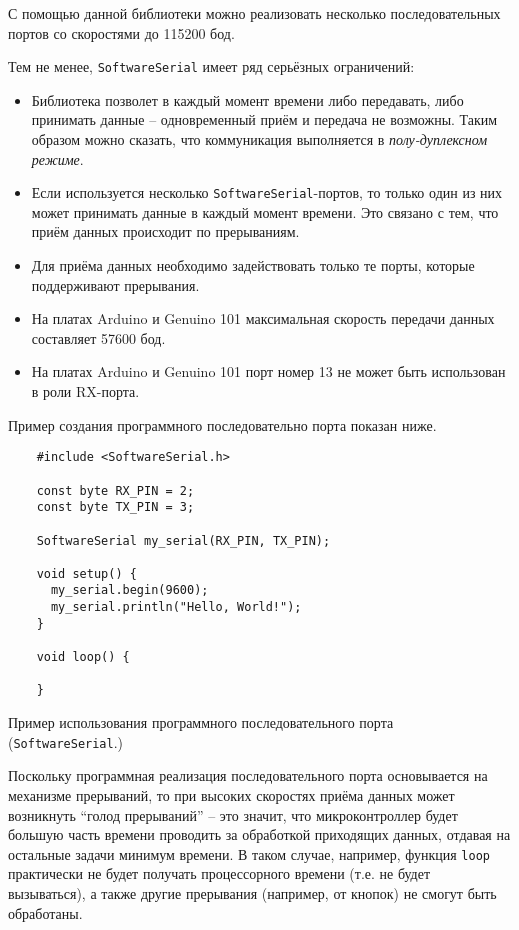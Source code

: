 \documentclass[../sparc.tex]{subfiles}
\begin{document}
С помощью данной библиотеки можно реализовать несколько последовательных портов
со скоростями до 115200 бод.

Тем не менее, \texttt{SoftwareSerial} имеет ряд серьёзных ограничений:
\begin{itemize}
\item Библиотека позволет в каждый момент времени либо передавать, либо
  принимать данные -- одновременный приём и передача не возможны. Таким образом
  можно сказать, что коммуникация выполняется в \emph{полу-дуплексном режиме}.
\item Если используется несколько \texttt{SoftwareSerial}-портов, то только один
  из них может принимать данные в каждый момент времени.  Это связано с тем, что
  приём данных происходит по прерываниям.
\item Для приёма данных необходимо задействовать только те порты, которые
  поддерживают прерывания.
\item На платах Arduino и Genuino 101 максимальная скорость передачи данных
  составляет 57600 бод.
\item На платах Arduino и Genuino 101 порт номер 13 не может быть использован в
  роли RX-порта.
\end{itemize}

Пример создания программного последовательно порта показан ниже.

\begin{listing}[H]
  \begin{verbatim}
    #include <SoftwareSerial.h>

    const byte RX_PIN = 2;
    const byte TX_PIN = 3;

    SoftwareSerial my_serial(RX_PIN, TX_PIN);

    void setup() {
      my_serial.begin(9600);
      my_serial.println("Hello, World!");
    }

    void loop() {

    }
  \end{verbatim}
  \label{listing:communication-serial-software}
  \caption{Пример использования программного последовательного порта
    (\texttt{SoftwareSerial}.)}
\end{listing}

Поскольку программная реализация последовательного порта основывается на
механизме прерываний, то при высоких скоростях приёма данных может возникнуть
``голод прерываний'' -- это значит, что микроконтроллер будет большую часть
времени проводить за обработкой приходящих данных, отдавая на остальные задачи
минимум времени.  В таком случае, например, функция \texttt{loop} практически не
будет получать процессорного времени (т.е. не будет вызываться), а также другие
прерывания (например, от кнопок) не смогут быть обработаны.
\end{document}
